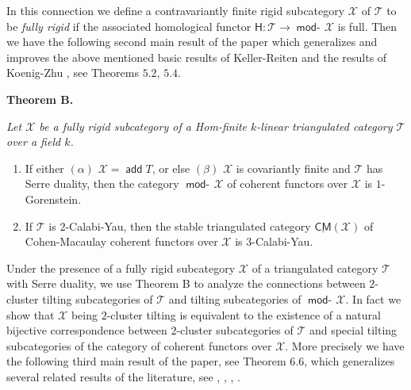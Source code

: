 \documentclass[oneside, a4paper,reqno]{amsart}
\numberwithin{equation}{section}
\theoremstyle{definition}
\begin{document}
 In this connection we define a contravariantly finite rigid subcategory ${\mathcal X}$ of ${\mathcal T}$ to be {\em fully rigid} if the associated homological functor $\mathsf{H} \colon {\mathcal T} {\longrightarrow} \operatorname*{\mathsf{mod}-\!}{\mathcal X}$ is full. Then we have the following second main result of the paper which generalizes and improves the above mentioned basic results of Keller-Reiten and the results of Koenig-Zhu \cite{KZ}, see Theorems $5.2$, $5.4$. 
 
 \medskip
 
 {\bf Theorem B.} {\em Let ${\mathcal X}$ be a fully rigid subcategory of a Hom-finite  $k$-linear triangulated category  
 ${\mathcal T}$ over a field $k$.
 \begin{enumerate}
 \item If either $(\alpha)$ ${\mathcal X} = \operatorname*{\mathsf{add}} T$, or else $(\beta)$ ${\mathcal X}$ is covariantly finite and ${\mathcal T}$ has Serre duality, then the category $\operatorname*{\mathsf{mod}-\!}{\mathcal X}$ of coherent functors over ${\mathcal X}$ is $1$-Gorenstein.  
\item If ${\mathcal T}$ is $2$-Calabi-Yau, then the stable triangulated category $\underline{\mathsf{CM}}({\mathcal X})$ of Cohen-Macaulay coherent functors over ${\mathcal X}$ is $3$-Calabi-Yau.
\end{enumerate}
}

 \medskip
 
Under the presence of a fully rigid subcategory ${\mathcal X}$ of a triangulated category ${\mathcal T}$ with Serre duality, we use  Theorem B to analyze the connections between $2$-cluster tilting subcategories of ${\mathcal T}$ and tilting subcategories of $\operatorname*{\mathsf{mod}-\!}{\mathcal X}$.  In fact we show that ${\mathcal X}$ being $2$-cluster tilting is equivalent to the existence of a natural  bijective correspondence between $2$-cluster subcategories of ${\mathcal T}$ and special tilting subcategories of the category of coherent functors over ${\mathcal X}$. More precisely  we have the following third main result of the paper, see Theorem $6.6$,  which generalizes several related results of the literature, see \cite{Smith}, \cite{FuLiu}, \cite{IT}, \cite{JH}. 

\medskip
\end{document}
